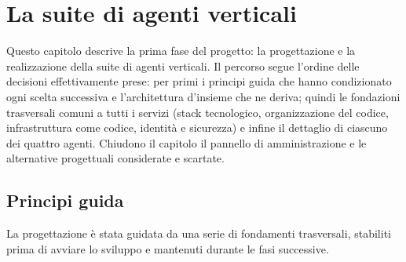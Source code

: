 
\chapter{La suite di agenti verticali}
\label{chap:agenti}

Questo capitolo descrive la prima fase del progetto: la progettazione e la
realizzazione della suite di agenti verticali. Il percorso segue l'ordine
delle decisioni effettivamente prese: per primi i principi guida che hanno
condizionato ogni scelta successiva e l'architettura d'insieme che ne
deriva; quindi le fondazioni trasversali comuni a tutti i servizi (stack
tecnologico, organizzazione del codice, infrastruttura come codice, identità
e sicurezza) e infine il dettaglio di ciascuno dei quattro agenti. 
Chiudono il capitolo il
pannello di amministrazione e le alternative progettuali considerate e
scartate.

\section{Principi guida}
\label{sec:agenti-principi}
\label{subsec:agenti-principi-guida}

La progettazione è stata guidata da una serie di fondamenti trasversali,
stabiliti prima di avviare lo sviluppo e mantenuti durante le fasi successive.

